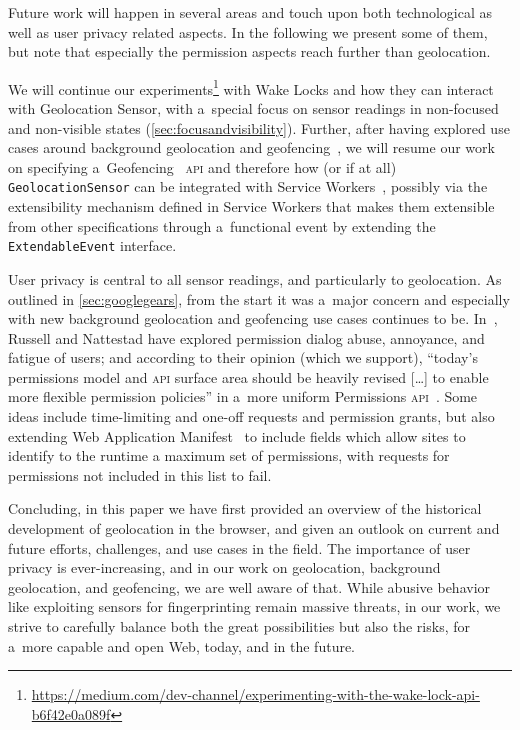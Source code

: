 \documentclass[sigconf,hyphens]{acmart}
\begin{document}
Future work will happen in several areas and touch upon both technological
as well as user privacy related aspects.
In the following we present some of them,
but note that especially the permission aspects reach further than geolocation.

We will continue our
experiments\footnote{\url{https://medium.com/dev-channel/experimenting-with-the-wake-lock-api-b6f42e0a089f}} 
with Wake Locks and how they can interact with Geolocation Sensor,
with a~special focus on sensor readings in non-focused and non-visible states (\autoref{sec:focusandvisibility}).
Further, after having explored use cases around background geolocation
and geofencing~\cite{kostiainen2018geolocation}, we will resume our work
on specifying a~Geofencing~\cite{kruisselbrink2017geofencing} \textsc{api}
and therefore how (or if at all) \texttt{GeolocationSensor} can be integrated
with Service Workers~\cite{russell2017serviceworkers},
possibly via the extensibility mechanism defined in Service Workers
that makes them extensible from other specifications through a~functional event
by extending the \texttt{ExtendableEvent} interface.

User privacy is central to all sensor readings, and particularly to geolocation.
As outlined in \autoref{sec:googlegears}, from the start it was a~major concern
and especially with new background geolocation and geofencing use cases continues to be.
In~\cite{russell2018permissions}, Russell and Nattestad have explored permission dialog
abuse, annoyance, and fatigue of users; and according to their opinion (which we support),
``today's permissions model and \textsc{api} surface area should be heavily revised
[\ldots] to enable more flexible permission policies'' in a~more uniform
Permissions \textsc{api}~\cite{lamouri2017permissions}.
Some ideas include time-limiting and one-off requests and permission grants, but also
extending Web Application Manifest~\cite{caceres2018manifest} to include
fields which allow sites to identify to the runtime a maximum set of permissions,
with requests for permissions not included in this list to fail.

Concluding, in this paper we have first provided an overview
of the historical development of geolocation in the browser,
and given an outlook on current and future efforts, challenges, and use cases in the field.
The importance of user privacy is ever-increasing, and in our work on geolocation,
background geolocation, and geofencing,
we are well aware of that.
While abusive behavior like exploiting sensors for fingerprinting remain massive threats,
in our work, we strive to carefully balance both the great possibilities but also the risks,
for a~more capable and open Web, today, and in the future.



\end{document}
